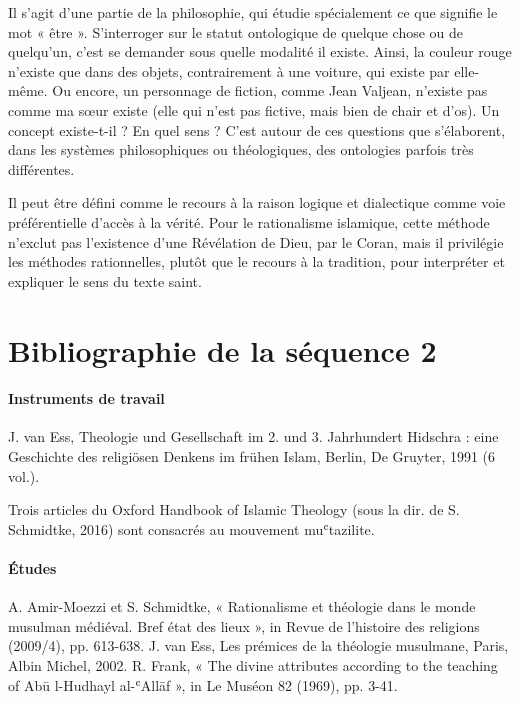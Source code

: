 \begin{Def}[Ontologie]
Il s'agit d'une partie de la philosophie, qui
étudie spécialement ce que signifie le mot « être ». S'interroger sur le
statut ontologique de quelque chose ou de quelqu'un, c'est se demander
sous quelle modalité il existe. Ainsi, la couleur rouge n'existe que
dans des objets, contrairement à une voiture, qui existe par elle-même.
Ou encore, un personnage de fiction, comme Jean Valjean, n'existe pas
comme ma sœur existe (elle qui n'est pas fictive, mais bien de chair et
d'os). Un concept existe-t-il ? En quel sens ? C'est autour de ces
questions que s'élaborent, dans les systèmes philosophiques ou
théologiques, des ontologies parfois très différentes.
\end{Def}
 

\begin{Def}[Rationalisme] Il peut être défini comme le recours à la raison
logique et dialectique comme voie préférentielle d'accès à la vérité.
Pour le rationalisme islamique, cette méthode n'exclut pas l'existence
d'une Révélation de Dieu, par le Coran, mais il privilégie les méthodes
rationnelles, plutôt que le recours à la tradition, pour interpréter et
expliquer le sens du texte saint.

\end{Def}




\section{Bibliographie de la séquence 2}


\paragraph{Instruments de travail}
J. van Ess, Theologie und Gesellschaft im 2. und 3. Jahrhundert Hidschra : eine Geschichte des religiösen Denkens im frühen Islam, Berlin, De Gruyter, 1991 (6 vol.).


Trois articles du Oxford Handbook of Islamic Theology (sous la dir. de S. Schmidtke, 2016) sont
consacrés au mouvement muʿtazilite.

\paragraph{Études}



A. Amir-Moezzi et S. Schmidtke, « Rationalisme et théologie dans le monde musulman médiéval. Bref état des lieux », in Revue de l’histoire des religions (2009/4), pp. 613-638.
J. van Ess, Les prémices de la théologie musulmane, Paris, Albin Michel, 2002.
R. Frank, « The divine attributes according to the teaching of Abū l-Hudhayl al-ʿAllāf », in Le Muséon 82 (1969), pp. 3-41.

